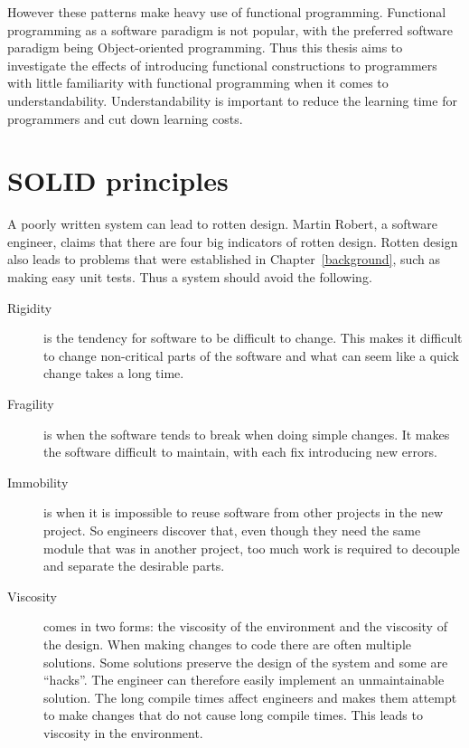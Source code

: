 However these patterns make heavy use of functional programming. Functional
programming as a software paradigm is not popular, with the preferred software
paradigm being Object-oriented programming. Thus this thesis aims to investigate
the effects of introducing functional constructions to programmers with little
familiarity with functional programming when it comes to understandability.
Understandability is important to reduce the learning time for programmers and
cut down learning costs.

\section{SOLID principles}\label{oop}


A poorly written  system can lead to rotten design. Martin Robert, a software
engineer, claims that there are four big indicators of rotten design. Rotten
design also leads to problems that were established in Chapter~\ref{background},
such as making easy unit tests. Thus a system should avoid the following.


\begin{description}

\item[ Rigidity ] is the tendency for software to be difficult to
change. This makes it difficult to change non-critical parts of the software and
what can seem like a quick change takes a long time.

\item[ Fragility ] is when the software tends to break when doing
simple changes. It makes the software difficult to maintain, with each fix
introducing new errors.

\item[ Immobility ] is when it is impossible to reuse software from
other projects in the new project. So engineers discover that, even though they
need the same module that was in another project, too much work is required to
decouple and separate the desirable parts.

\item[ Viscosity ] comes in two forms: the viscosity of the environment and the
    viscosity of the design. When making changes to code there are often
        multiple solutions. Some solutions preserve the design of the system and
        some are ``hacks''. The engineer can therefore easily implement an
        unmaintainable solution. The long compile times affect engineers and
        makes them attempt to make changes that do not cause long compile times.
        This leads to viscosity in the environment.

\end{description}

